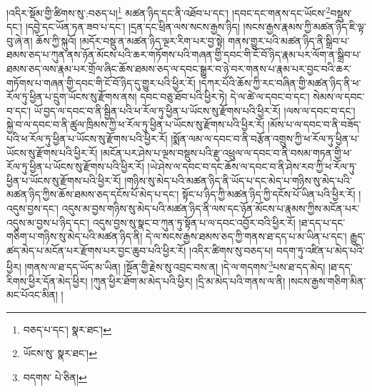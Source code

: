 །འདིར་སྡོམ་གྱི་ཚིགས་སུ་:བཅད་པ།\footnote{བཅད་པ་དང་།  སྣར་ཐང་། } མཚན་ཉིད་དང་ནི་འཐོབ་པ་དང་། །དབང་དང་གནས་དང་ཡོངས་\footnote{ཡོངས་སུ་  སྣར་ཐང་། }བསྡུས་དང་། །དབྱེ་དང་ཡོན་ཏན་ཟབ་པ་དང་། །དྲན་དང་ཕྲིན་ལས་སངས་རྒྱས་ཉིད། །སངས་རྒྱས་རྣམས་ཀྱི་མཚན་ཉིད་ཇི་ལྟ་བུ་ཞེ་ན། ཆོས་ཀྱི་སྐུའོ། །མདོར་བསྡུ་ན་མཚན་ཉིད་ལྔར་རིག་པར་བྱ་སྟེ། གནས་གྱུར་པའི་མཚན་ཉིད་ནི་སྒྲིབ་པ་ཐམས་ཅད་པ་ཀུན་ནས་ཉོན་མོངས་པའི་ཆར་གཏོགས་པའི་གཞན་གྱི་དབང་གི་ངོ་བོ་ཉིད་རྣམ་པར་ལོག་ན་སྒྲིབ་པ་ཐམས་ཅད་ལས་རྣམ་པར་གྲོལ་ཞིང་ཆོས་ཐམས་ཅད་ལ་དབང་སྒྱུར་བ་ཉེ་བར་གནས་པ་རྣམ་པར་བྱང་བའི་ཆར་གཏོགས་པ་གཞན་གྱི་དབང་གི་ངོ་བོ་ཉིད་དུ་གྱུར་པའི་ཕྱིར་རོ། །དཀར་པོའི་ཆོས་ཀྱི་རང་བཞིན་གྱི་མཚན་ཉིད་ནི་ཕ་རོལ་ཏུ་ཕྱིན་པ་དྲུག་ཡོངས་སུ་རྫོགས་ནས། དབང་བཅུ་ཐོབ་པའི་ཕྱིར་ཏེ། དེ་ལ་ཚེ་ལ་དབང་བ་དང་། སེམས་ལ་དབང་བ་དང་། ཡོ་བྱད་ལ་དབང་བ་ནི་སྦྱིན་པའི་ཕ་རོལ་ཏུ་ཕྱིན་པ་ཡོངས་སུ་རྫོགས་པའི་ཕྱིར་རོ། །ལས་ལ་དབང་བ་དང་། སྐྱེ་བ་ལ་དབང་བ་ནི་ཚུལ་ཁྲིམས་ཀྱི་ཕ་རོལ་ཏུ་ཕྱིན་པ་ཡོངས་སུ་རྫོགས་པའི་ཕྱིར་རོ། །མོས་པ་ལ་དབང་བ་ནི་བཟོད་པའི་ཕ་རོལ་ཏུ་ཕྱིན་པ་ཡོངས་སུ་རྫོགས་པའི་ཕྱིར་རོ། །སྨོན་ལམ་ལ་དབང་བ་ནི་བརྩོན་འགྲུས་ཀྱི་ཕ་རོལ་ཏུ་ཕྱིན་པ་ཡོངས་སུ་རྫོགས་པའི་ཕྱིར་རོ། །མངོན་པར་ཤེས་པ་ལྔས་བསྡུས་པའི་རྫུ་འཕྲུལ་ལ་དབང་བ་ནི་བསམ་གཏན་གྱི་ཕ་རོལ་ཏུ་ཕྱིན་པ་ཡོངས་སུ་རྫོགས་པའི་ཕྱིར་རོ། །ཡེ་ཤེས་ལ་དབང་བ་དང་ཆོས་ལ་དབང་བ་ནི་ཤེས་རབ་ཀྱི་ཕ་རོལ་ཏུ་ཕྱིན་པ་ཡོངས་སུ་རྫོགས་པའི་ཕྱིར་རོ། །གཉིས་སུ་མེད་པའི་མཚན་ཉིད་ནི་ཡོད་པ་དང་མེད་པ་གཉིས་སུ་མེད་པའི་མཚན་ཉིད་ཀྱིས་ཆོས་ཐམས་ཅད་དངོས་པོ་མེད་པ་དང་། སྟོང་པ་ཉིད་ཀྱི་མཚན་ཉིད་ཀྱི་དངོས་པོ་ཡིན་པའི་ཕྱིར་རོ། །འདུས་བྱས་དང་། འདུས་མ་བྱས་གཉིས་སུ་མེད་པའི་མཚན་ཉིད་ནི་ལས་དང་ཉོན་མོངས་པ་རྣམས་ཀྱིས་མངོན་པར་འདུས་མ་བྱས་པ་ཉིད་དང་། འདུས་བྱས་སུ་སྣང་བ་ཀུན་ཏུ་སྟོན་པ་ལ་དབང་འབྱོར་བའི་ཕྱིར་རོ། །ཐ་དད་པ་དང་གཅིག་པ་གཉིས་སུ་མེད་པའི་མཚན་ཉིད་ནི། དེ་ལ་སངས་རྒྱས་ཐམས་ཅད་ཀྱི་གནས་ཐ་དད་པ་མ་ཡིན་པ་དང་། རྒྱུད་ཚད་མེད་པ་མངོན་པར་རྫོགས་པར་བྱང་ཆུབ་པའི་ཕྱིར་རོ། །འདིར་ཚིགས་སུ་བཅད་པ། བདག་ཏུ་འཛིན་པ་མེད་པའི་ཕྱིར། །གནས་ལ་ཐ་དད་ཡོད་མ་ཡིན། །སྔོན་གྱི་རྗེས་སུ་འབྲང་བས་ན། །དེ་ལ་གདགས་\footnote{བདགས་  པེ་ཅིན། }པས་ཐ་དད་མེད། །ཐ་དད་རིགས་ཕྱིར་དོན་མེད་ཕྱིར། །ཀུན་ཕྱིར་ཐོག་མ་མེད་པའི་ཕྱིར། །དྲི་མ་མེད་པའི་གནས་ལ་ནི། །སངས་རྒྱས་གཅིག་མིན་མང་པོའང་མིན། །
